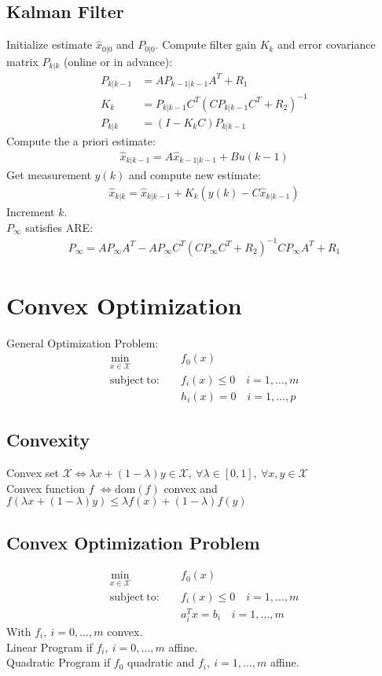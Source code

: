 \documentclass[a4paper,landscape,8pt,fleqn]{scrartcl}
\newcommand{\mc}[1]{\mathcal{#1}}
\begin{document}
\begin{multicols}{3}
\subsection{Kalman Filter}
Initialize estimate $\hat{x}_{0|0}$ and $P_{0|0}$. Compute filter gain $K_k$ and error covariance matrix $P_{k|k}$ (online or in advance):
\begin{align*}
	P_{k|k-1} &= A P_{k-1|k-1} A^T + R_1 \\
	K_k &= P_{k|k-1}C^T(C P_{k|k-1} C^T + R_2)^{-1}\\
	P_{k|k} &= (I-K_k C )P_{k|k-1}
\end{align*}
Compute the a priori estimate:
\begin{align*}
	\hat{x}_{k|k-1} = A \hat{x}_{k-1|k-1} + B u(k-1)
\end{align*}
Get measurement $y(k)$ and compute new estimate:
\begin{align*}
	\hat{x}_{k|k} = \hat{x}_{k|k-1} + K_k(y(k)-C\hat{x}_{k|k-1})
\end{align*}
Increment $k$.\\ $P_\infty$ satisfies ARE:
\begin{align*}
	P_\infty = A P_\infty A^T - A P_\infty C^T \left( C P_\infty C^T + R_2\right)^{-1} C P_\infty A^T +R_1
\end{align*}
\section{Convex Optimization}
General Optimization Problem:
\begin{align*}
	\min_{x \in \mc{X}} & \quad f_0(x)\\
	\mathrm{subject~to:} & \quad f_i(x)\leq 0 \quad i=1,\dots,m \\
	& \quad h_i(x)=0 \quad i=1,\dots,p
\end{align*}
\subsection{Convexity}
Convex set $\mc{X} \Leftrightarrow \lambda x + (1-\lambda)y \in \mc{X} ,~\forall \lambda \in [0,1], ~\forall x,y \in \mc{X}$\\
Convex function $f$ $\Leftrightarrow \mathrm{dom}(f)$ convex and \\$f(\lambda x + (1-\lambda)y) \leq \lambda f(x) + (1-\lambda)f(y)$
\subsection{Convex Optimization Problem}
\begin{align*}
	\min_{x \in \mc{X}} &\quad f_0(x)\\
	\mathrm{subject~to:}&\quad f_i(x)\leq 0 \quad i=1,\dots,m\\
	& \quad a_i^Tx = b_i \quad i=1,\dots,m
\end{align*}
With $f_i, ~i=0,\dots,m$ convex.\\
Linear Program if $f_i, ~i=0,\dots,m$ affine. \\Quadratic Program if $f_0$ quadratic and $f_i, ~i=1,\dots,m$ affine.

\end{multicols}
\end{document}
